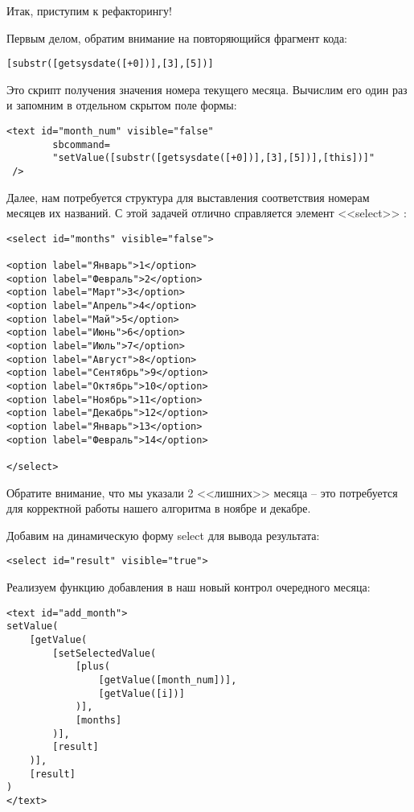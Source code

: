 \documentclass[../index.tex]{subfiles}
\begin{document}
Итак, приступим к рефакторингу!

Первым делом, обратим внимание на повторяющийся фрагмент кода:

\begin{verbatim}
[substr([getsysdate([+0])],[3],[5])]
\end{verbatim}

Это скрипт получения значения номера текущего месяца.
Вычислим его один раз и запомним в отдельном скрытом поле формы:

\begin{verbatim}
<text id="month_num" visible="false"
        sbcommand=
        "setValue([substr([getsysdate([+0])],[3],[5])],[this])]" 
 />
\end{verbatim}

Далее, нам потребуется структура для выставления соответствия номерам месяцев их названий. С этой задачей отлично справляется элемент <<select>> :

\begin{verbatim}
<select id="months" visible="false"> 

<option label="Январь">1</option>
<option label="Февраль">2</option>
<option label="Март">3</option>
<option label="Апрель">4</option>
<option label="Май">5</option>
<option label="Июнь">6</option>
<option label="Июль">7</option>
<option label="Август">8</option>
<option label="Сентябрь">9</option>
<option label="Октябрь">10</option>
<option label="Ноябрь">11</option>
<option label="Декабрь">12</option>
<option label="Январь">13</option>
<option label="Февраль">14</option>

</select>
\end{verbatim}

Обратите внимание, что мы указали 2 <<лишних>> месяца -- это потребуется для корректной работы нашего алгоритма в ноябре и декабре.

Добавим на динамическую форму select для вывода результата:
\begin{verbatim}
<select id="result" visible="true"> 
\end{verbatim}

Реализуем функцию добавления в наш новый контрол очередного месяца:

\begin{verbatim}
<text id="add_month">
setValue(
    [getValue(
        [setSelectedValue(
            [plus(
                [getValue([month_num])],
                [getValue([i])]
            )], 
            [months]
        )],
        [result]
    )],
    [result]
)
</text>
\end{verbatim}
\end{document}
